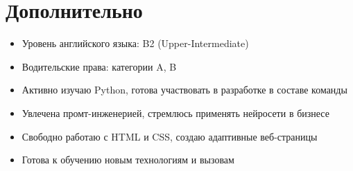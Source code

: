 \documentclass[a4paper,12pt]{article}
\begin{document}
\section{Дополнительно}
\begin{itemize}
    \item Уровень английского языка: B2 (Upper-Intermediate)
    \item Водительские права: категории A, B
    \item Активно изучаю Python, готова участвовать в разработке в составе команды
    \item Увлечена промт-инженерией, стремлюсь применять нейросети в бизнесе
    \item Свободно работаю с HTML и CSS, создаю адаптивные веб-страницы
    \item Готова к обучению новым технологиям и вызовам
\end{itemize}
\end{document}
